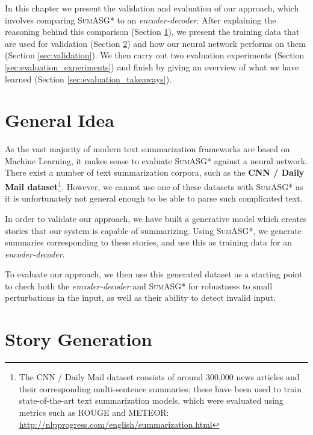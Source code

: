 \label{chapter:evaluation}

In this chapter we present the validation and evaluation of our approach, which involves comparing \textsc{SumASG*} to an \textit{encoder-decoder}. After explaining the reasoning behind this comparison (Section \ref{sec:evaluation_general_idea}), we present the training data that are used for validation (Section \ref{sec:story_generation}) and how our neural network performs on them (Section \ref{sec:validation}). We then carry out two evaluation experiments (Section \ref{sec:evaluation_experiments}) and finish by giving an overview of what we have learned (Section \ref{sec:evaluation_takeaways}).

\section{General Idea}
\label{sec:evaluation_general_idea}

As the vast majority of modern text summarization frameworks are based on Machine Learning, it makes sense to evaluate \textsc{SumASG*} against a neural network. There exist a number of text summarization corpora, such as the \textbf{CNN / Daily Mail dataset}\footnote{The CNN / Daily Mail dataset consists of around 300,000 news articles and their corresponding multi-sentence summaries; these have been used to train state-of-the-art text summarization models, which were evaluated using metrics such as ROUGE and METEOR: \url{http://nlpprogress.com/english/summarization.html}}. However, we cannot use one of these datasets with \textsc{SumASG*} as it is unfortunately not general enough to be able to parse such complicated text.

In order to validate our approach, we have built a generative model which creates stories that our system is capable of summarizing. Using \textsc{SumASG*}, we generate summaries corresponding to these stories, and use this as training data for an \textit{encoder-decoder}.

To evaluate our approach, we then use this generated dataset as a starting point to check both the \textit{encoder-decoder} and \textsc{SumASG*} for robustness to small perturbations in the input, as well as their ability to detect invalid input.

\section{Story Generation}
\label{sec:story_generation}

